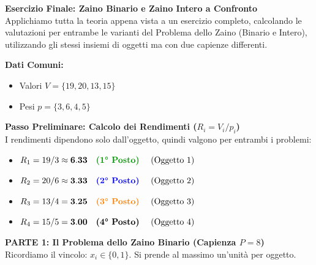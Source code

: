 \documentclass[12pt, a4paper]{article}
\newcommand{\separatore}{\noindent{\color{titlecolor!50}\rule{\textwidth}{0.6pt}}}
\begin{document}
	\vspace{0.6cm}
	\separatore
	\vspace{0.4cm}
	
	\vspace{0.4cm}
	\textbf{Esercizio Finale: Zaino Binario e Zaino Intero a Confronto}\\
	Applichiamo tutta la teoria appena vista a un esercizio completo, calcolando le valutazioni per entrambe le varianti del Problema dello Zaino (Binario e Intero), utilizzando gli stessi insiemi di oggetti ma con due capienze differenti.
	
	\textbf{Dati Comuni:}
	\begin{itemize}[label=$\circ$, itemsep=2pt, leftmargin=1.5cm]
		\item Valori $V = \{19, 20, 13, 15\}$
		\item Pesi $p = \{3, 6, 4, 5\}$
	\end{itemize}
	
	\textbf{Passo Preliminare: Calcolo dei Rendimenti ($R_i = V_i / p_i$)}\\
	I rendimenti dipendono solo dall'oggetto, quindi valgono per entrambi i problemi:
	\begin{itemize}[label=$\circ$, itemsep=2pt, leftmargin=1.5cm]
		\item $R_1 = 19 / 3 \approx \mathbf{6.33} \quad \text{\textcolor{green!60!black}{\textbf{(1° Posto)}} \quad (Oggetto 1)}$
		\item $R_2 = 20 / 6 \approx \mathbf{3.33} \quad \text{\textcolor{blue}{\textbf{(2° Posto)}} \quad (Oggetto 2)}$
		\item $R_3 = 13 / 4 = \mathbf{3.25} \quad \text{\textcolor{orange}{\textbf{(3° Posto)}} \quad (Oggetto 3)}$
		\item $R_4 = 15 / 5 = \mathbf{3.00} \quad \text{\textbf{(4° Posto)} \quad (Oggetto 4)}$
	\end{itemize}
	
	\vspace{0.6cm}
	\separatore
	\vspace{0.4cm}
	
	\textbf{PARTE 1: Il Problema dello Zaino Binario (Capienza $P = 8$)}\\
	Ricordiamo il vincolo: $x_i \in \{0, 1\}$. Si prende al massimo un'unità per oggetto.
	
\end{document}
